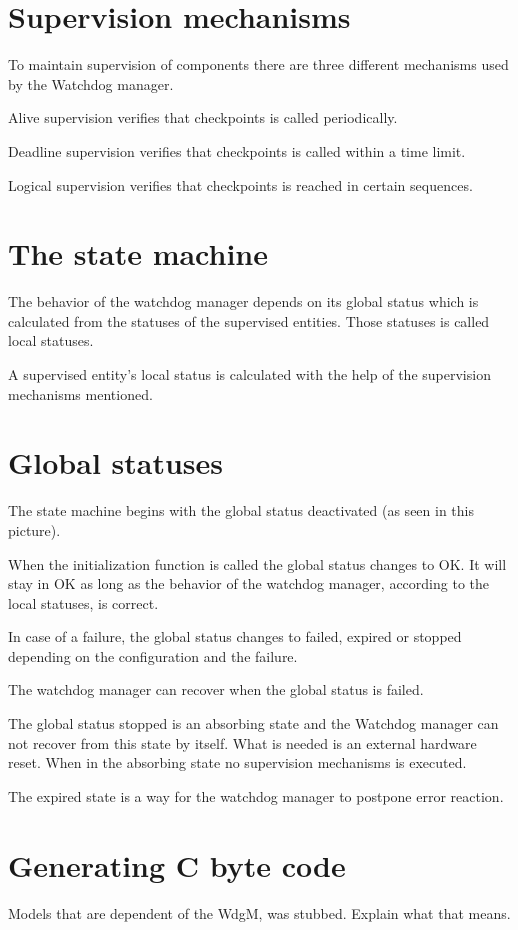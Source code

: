 \documentclass[a4paper]{article}
\begin{document}
\section{Supervision mechanisms}
To maintain supervision of components there are three different
mechanisms used by the Watchdog manager.

Alive supervision verifies that checkpoints is called periodically.

Deadline supervision verifies that checkpoints is called within a time
limit.

Logical supervision verifies that checkpoints is reached in certain sequences.

\section{The state machine}
The behavior of the watchdog manager depends on its global status
which is calculated from the statuses of the supervised
entities. Those statuses is called local statuses.

A supervised entity's local status is calculated with the help of the
supervision mechanisms mentioned.

\section{Global statuses}
The state machine begins with the global status deactivated (as seen
in this picture).

When the initialization function is called the global status changes
to OK.
It will stay in OK as long as the behavior of the watchdog manager,
according to the local statuses, is correct.

In case of a failure, the global status changes to failed, expired or
stopped depending on the configuration and the failure.

The watchdog manager can recover when the global status is failed.

The global status stopped is an absorbing state and the Watchdog
manager can not recover from this state by itself. What is needed is
an external hardware reset. When in the absorbing state no supervision
mechanisms is executed.

The expired state is a way for the watchdog manager to postpone error
reaction.

\section{Generating C byte code}
Models that are dependent of the WdgM, was stubbed. Explain what that means.
\end{document}
